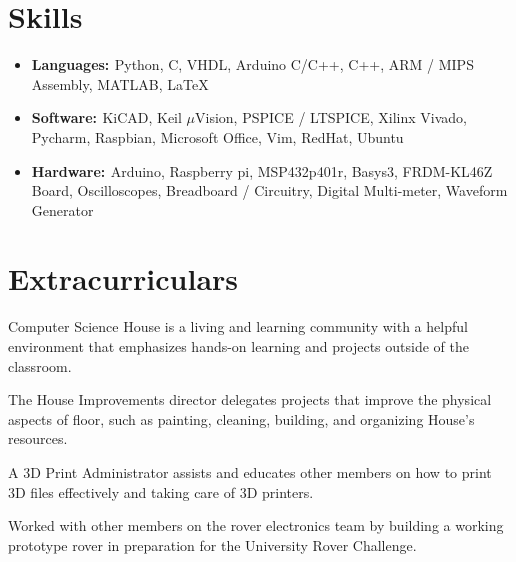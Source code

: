 \documentclass[a4paper]{comcv}
\begin{document}

\section{Skills}
\begin{itemize}
    \item {\bf{Languages: }}  {Python, C, VHDL, Arduino C/C++, C++, ARM / MIPS Assembly, MATLAB, \LaTeX} 
    
    \item {\bf{Software: }} {KiCAD, Keil $\mu$Vision, PSPICE / LTSPICE, Xilinx Vivado, Pycharm, Raspbian, Microsoft Office, Vim, RedHat, Ubuntu}
    
    \item {\bf{Hardware: }}  {Arduino, Raspberry pi, MSP432p401r,  Basys3,  FRDM-KL46Z Board, Oscilloscopes, Breadboard / Circuitry, Digital Multi-meter, Waveform Generator} 
\end{itemize}


\section{Extracurriculars}

\vspace{\topsep}
\begin{tightlist}
    \item Computer Science House is a living and learning community with a helpful environment that emphasizes hands-on learning and projects outside of the classroom.

    \item The House Improvements director delegates projects that improve the physical aspects of floor, such as painting, cleaning, building, and organizing House's resources.

	\item A 3D Print Administrator assists and educates other members on how to print 3D files effectively and taking care of 3D printers.
	
\end{tightlist}


\vspace{\topsep}
\begin{tightlist}
    \item Worked with other members on the rover electronics team by building a working prototype rover in preparation for the University Rover Challenge. 

\end{tightlist}
\end{document}
